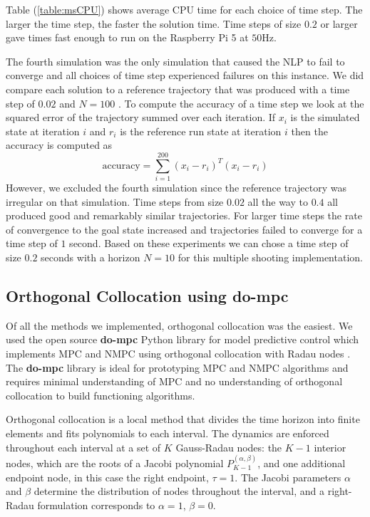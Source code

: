 \documentclass[]{article}
\begin{document}
	Table (\ref{table:msCPU}) shows average CPU time for each choice of time step.   The larger the time step, the faster the solution time.  Time steps of size $0.2$ or larger gave times fast enough to run on the Raspberry Pi 5 at $50$Hz. 
	
	The fourth simulation was the only simulation that caused the NLP to fail to converge and all choices of time step experienced failures on this instance. We did compare each solution to a reference trajectory that was produced with a time step of $0.02$ and $N=100$ . To compute the accuracy of a time step we look at the squared error of the trajectory summed over each iteration.  If $x_i$ is the simulated state at iteration $i$ and $r_i$ is the reference run state at iteration $i$ then the accuracy is computed as 
	\[\text{accuracy} =  \sum_{i=1}^{200} (x_i - r_i)^T(x_i - r_i)\]
	However, we excluded the fourth simulation since the reference trajectory was irregular on that simulation.  Time steps from size $0.02$ all the way to $0.4$ all produced good and remarkably similar trajectories. For larger time steps the rate of convergence to the goal state increased and trajectories failed to converge for a time step of $1$ second.  Based on these experiments we can chose a time step of size $0.2$ seconds with a horizon $N=10$ for this multiple shooting implementation.
	
	

\subsection*{Orthogonal Collocation using {do-mpc}} 
Of all the methods we implemented, orthogonal collocation was the easiest. We used the open source {\bf do-mpc} Python library for model predictive control  \citep{do-mpc}   which implements MPC and NMPC using orthogonal collocation with Radau nodes \citep{dompc-oc}.
The {\bf do-mpc} library is ideal for prototyping  MPC and NMPC algorithms and requires minimal understanding of MPC and no understanding of orthogonal collocation to build functioning algorithms.


Orthogonal collocation is a local method that divides the time horizon into finite elements and fits polynomials to each interval. The dynamics are enforced throughout each interval at a set of $K$ Gauss-Radau nodes: the $K-1$ interior nodes, which are the roots of a Jacobi polynomial $P_{K-1}^{(\alpha,\beta)}$, and one additional endpoint node, in this case the right endpoint, $\tau=1$. The Jacobi parameters $\alpha$ and $\beta$ determine the distribution of nodes throughout the interval, and a right-Radau formulation corresponds to $\alpha=1$, $\beta=0$.
\end{document}
